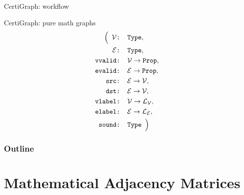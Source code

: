 \documentclass[usenames, xcolor=dvipsnames]{beamer}
\begin{document}
\begin{frame}{CertiGraph: workflow}
  
\end{frame}

\begin{frame}{CertiGraph: pure math graphs}
  \begin{align*}
\Big(\hspace{0.5em}\mathcal{V}& \texttt{: Type}, \\
\mathcal{E}& \texttt{: Type}, \\
\texttt{vvalid}& \texttt{: }\mathcal{V} \rightarrow \texttt{Prop}, \\ 
\texttt{evalid}& \texttt{: }\mathcal{E} \rightarrow \texttt{Prop}, \\
\texttt{src}& \texttt{: }\mathcal{E} \rightarrow \mathcal{V}, \\
\texttt{dst}& \texttt{: }\mathcal{E} \rightarrow \mathcal{V}, \\
\texttt{vlabel}& \texttt{: }\mathcal{V} \rightarrow \mathcal{L_V}, \\
\texttt{elabel}& \texttt{: }\mathcal{E} \rightarrow \mathcal{L_E}, \\
\texttt{sound}&\texttt{: Type} \hspace{0.5em} \Big) 
\end{align*}

\end{frame}

\begin{frame}
\frametitle{Outline}
\tableofcontents
\end{frame}

\section{Mathematical Adjacency Matrices}
\end{document}
